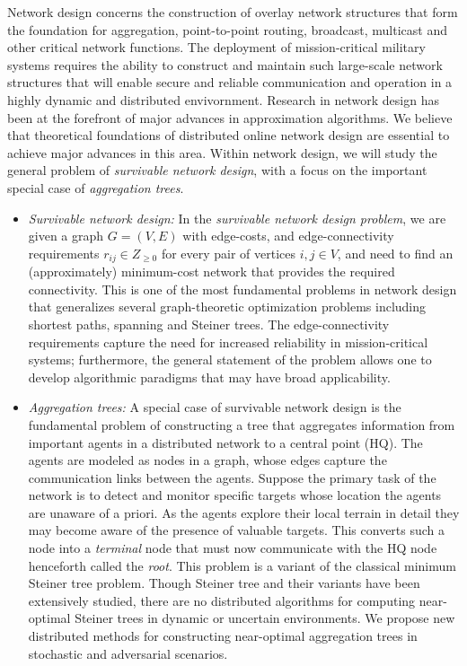  Network design concerns the construction of
overlay network structures that form the foundation for aggregation,
point-to-point routing, broadcast, multicast and other critical
network functions.  The deployment of mission-critical military
systems requires the ability to construct and maintain such
large-scale network structures that will enable secure and reliable
communication and operation in a highly dynamic and distributed
envivornment.  Research in network design has been at the forefront of
major advances in approximation algorithms.  We believe that
theoretical foundations of distributed online network design are
essential to achieve major advances in this area.  Within network
design, we will study the general problem of {\em survivable network
  design}, with a focus on the important special case of {\em
  aggregation trees}.

\begin{itemize}
\item
{\sl Survivable network design:} In the {\em survivable network design
  problem}, we are given a graph $G = (V,E)$ with edge-costs, and
edge-connectivity requirements $r_{ij} \in Z_{\ge 0}$ for every pair
of vertices $i, j \in V$, and need to find an (approximately)
minimum-cost network that provides the required connectivity.  This is
one of the most fundamental problems in network design that
generalizes several graph-theoretic optimization problems including
shortest paths, spanning and Steiner trees.  The edge-connectivity
requirements capture the need for increased reliability in
mission-critical systems; furthermore, the general statement of the
problem allows one to develop algorithmic paradigms that may have
broad applicability.

\item
{\sl Aggregation trees:} A special case of survivable network design
is the fundamental problem of constructing a tree that aggregates
information from important agents in a distributed network to a
central point (HQ). The agents are modeled as nodes in a graph, whose
edges capture the communication links between the agents.  Suppose the
primary task of the network is to detect and monitor specific targets
whose location the agents are unaware of a priori.  As the agents
explore their local terrain in detail they may become aware of the
presence of valuable targets. This converts such a node into a {\em
  terminal} node that must now communicate with the HQ node henceforth
called the {\em root}.  This problem is a variant of the classical
minimum Steiner tree problem.  Though Steiner tree and their variants
have been extensively studied, there are no distributed algorithms for
computing near-optimal Steiner trees in dynamic or uncertain
environments.  We propose new distributed methods for constructing
near-optimal aggregation trees in stochastic and adversarial
scenarios.
\end{itemize}

